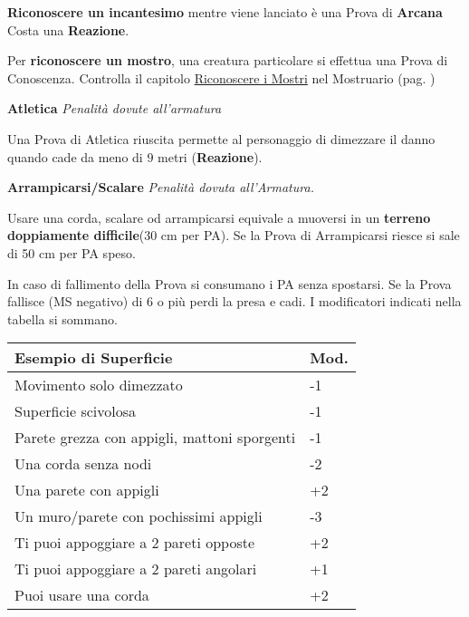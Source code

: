 \documentclass[12pt,a4paper,twoside,openany]{book}
\begin{document}
\begin{multicols}{2}
\medskip

\textbf{Riconoscere un incantesimo} mentre viene lanciato è una Prova di \textbf{Arcana} Costa una \textbf{Reazione}.
\medskip

Per \textbf{riconoscere un mostro}, una creatura particolare si effettua una Prova di Conoscenza. Controlla il capitolo \hyperlink{riconoscereimostri}{Riconoscere i Mostri} nel Mostruario (pag. \pageref{riconoscereimostri})

\medskip

\textbf{Atletica} \textit{Penalità dovute all'armatura}

Una Prova di Atletica riuscita permette al personaggio di dimezzare il danno quando cade da meno di 9 metri (\textbf{Reazione}).

\medskip

\textbf{Arrampicarsi/Scalare}  \textit{Penalità dovuta all'Armatura.}

\medskip

Usare una corda, scalare od arrampicarsi equivale a muoversi in un \textbf{terreno doppiamente difficile}(30 cm per PA). Se la Prova di Arrampicarsi riesce si sale di 50 cm per PA speso.

In caso di fallimento della Prova si consumano i PA senza spostarsi. Se la Prova fallisce (MS negativo) di 6 o più perdi la presa e cadi. I modificatori indicati nella tabella si sommano.\\

\begin{tabularx}{0.45\textwidth}{Xl}
	\textbf{Esempio di Superficie} & Mod.\\
	\toprule
	Movimento solo dimezzato & -1\\
	Superficie scivolosa&-1\\
	Parete grezza con appigli, mattoni sporgenti&-1\\
	Una corda senza nodi&-2\\
	Una parete con appigli &+2\\
	Un muro/parete con pochissimi appigli&-3\\
	Ti puoi appoggiare a 2 pareti opposte&+2\\
	Ti puoi appoggiare a 2 pareti angolari&+1\\
	Puoi usare una corda&+2\\
\end{tabularx}\\


\end{multicols}
\end{document}
